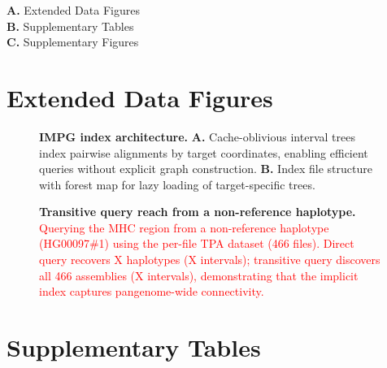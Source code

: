 
\noindent\textbf{A.} Extended Data Figures\\
\textbf{B.} Supplementary Tables\\
\textbf{C.} Supplementary Figures

\section{Extended Data Figures}

\begin{figure}[H]
    \caption{
      \textbf{IMPG index architecture.}
      \textbf{A.} Cache-oblivious interval trees index pairwise alignments by target coordinates, enabling efficient queries without explicit graph construction.
      \textbf{B.} Index file structure with forest map for lazy loading of target-specific trees.
    }
    \label{fig:architecture}
\end{figure}

\begin{figure}[H]
    \caption{
      \textbf{Transitive query reach from a non-reference haplotype.}
      \textcolor{red}{Querying the MHC region from a non-reference haplotype (HG00097\#1) using the per-file TPA dataset (466 files). Direct query recovers X haplotypes (X intervals); transitive query discovers all 466 assemblies (X intervals), demonstrating that the implicit index captures pangenome-wide connectivity.}
    }
    \label{fig:transitive_reach}
\end{figure}


\section{Supplementary Tables}

